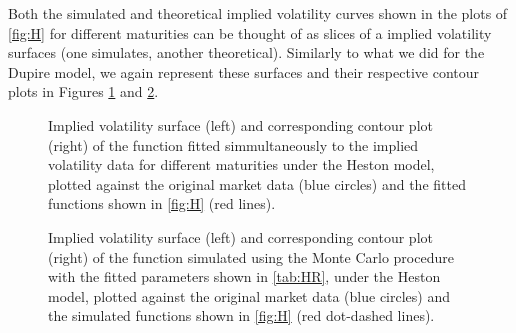 Both the simulated and theoretical implied volatility curves shown in the plots of \autoref{fig:H} for different maturities can be thought of as slices of a implied volatility surfaces (one simulates, another theoretical). Similarly to what we did for the Dupire model, we again represent these surfaces and their respective contour plots in Figures \ref{fig:HS} and \ref{fig:HSSim}.


\begin{figure}[H]
  \begin{subfigmatrix}{2}
  \end{subfigmatrix}
    \caption[Implied volatility surface and corresponding contour plot of the function fitted simmultaneously to the implied volatility data for different maturities under the Heston model, plotted against the original market data and the fitted functions shown in \autoref{fig:H}.]{Implied volatility surface (left) and corresponding contour plot (right) of the function fitted simmultaneously to the implied volatility data for different maturities under the Heston model, plotted against the original market data (blue circles) and the fitted functions shown in \autoref{fig:H} (red lines).}\label{fig:HS}
\end{figure}   


\begin{figure}[H]
  \begin{subfigmatrix}{2}
  \end{subfigmatrix}
    \caption[Implied volatility surface and corresponding contour plot of the function simulated using the Monte Carlo procedure with the fitted parameters shown in \autoref{tab:HR}, under the Heston model, plotted against the original market data and the simulated functions shown in \autoref{fig:H}.]{Implied volatility surface (left) and corresponding contour plot (right) of the function simulated using the Monte Carlo procedure with the fitted parameters shown in \autoref{tab:HR}, under the Heston model, plotted against the original market data (blue circles) and the simulated functions shown in \autoref{fig:H} (red dot-dashed lines).}\label{fig:HSSim}
\end{figure} 


